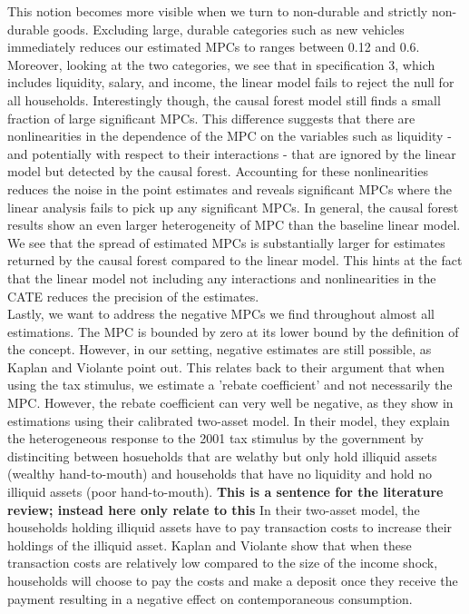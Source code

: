 This notion becomes more visible when we turn to non-durable and strictly non-durable goods. Excluding large, durable categories such as new vehicles immediately reduces our estimated MPCs to ranges between 0.12 and 0.6. Moreover, looking at the two categories, we see that in specification 3, which includes liquidity, salary, and income, the linear model fails to reject the null for all households. Interestingly though, the causal forest model still finds a small fraction of large significant MPCs. This difference suggests that there are nonlinearities in the dependence of the MPC on the variables such as liquidity - and potentially with respect to their interactions - that are ignored by the linear model but detected by the causal forest. Accounting for these nonlinearities reduces the noise in the point estimates and reveals significant MPCs where the linear analysis fails to pick up any significant MPCs. In general, the causal forest results show an even larger heterogeneity of MPC than the baseline linear model. We see that the spread of estimated MPCs is substantially larger for estimates returned by the causal forest compared to the linear model. This hints at the fact that the linear model not including any interactions and nonlinearities in the CATE reduces the precision of the estimates. \\
Lastly, we want to address the negative MPCs we find throughout almost all estimations. The MPC is bounded by zero at its lower bound by the definition of the concept. However, in our setting, negative estimates are still possible, as Kaplan and Violante point out. This relates back to their argument that when using the tax stimulus, we estimate a 'rebate coefficient' and not necessarily the MPC. However, the rebate coefficient can very well be negative, as they show in estimations using their calibrated two-asset model. In their model, they explain the heterogeneous response to the 2001 tax stimulus by the government by distinciting between hosueholds that are welathy but only hold illiquid assets (wealthy hand-to-mouth) and households that have no liquidity and hold no illiquid assets (poor hand-to-mouth). \textbf{This is a sentence for the literature review; instead here only relate to this} In their two-asset model, the households holding illiquid assets have to pay transaction costs to increase their holdings of the illiquid asset. Kaplan and Violante show that when these transaction costs are relatively low compared to the size of the income shock, households will choose to pay the costs and make a deposit once they receive the payment resulting in a negative effect on contemporaneous consumption. 